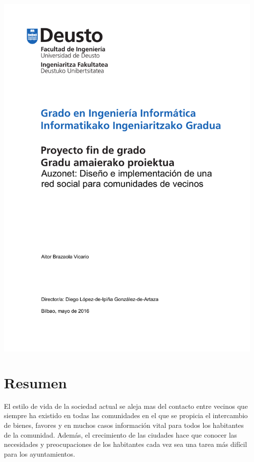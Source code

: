 \documentclass{DeustoFDP}
\begin{document}
\frontmatter
\pagestyle{plain}

\begin{titlepage}
    \includegraphics{fig/portada}
    \restoregeometry
\end{titlepage}
\cleardoublepage

\setcounter{page}{3}

\chapter*{Resumen}
El estilo de vida de la sociedad actual se aleja mas del contacto entre vecinos
que siempre ha existido en todas las comunidades en el que se propicia el
intercambio de bienes, favores y en muchos casos información vital para todos
los habitantes de la comunidad. Además, el crecimiento de las ciudades hace
que conocer las necesidades y preocupaciones de los habitantes cada vez sea una
tarea más difícil para los ayuntamientos.
\end{document}
